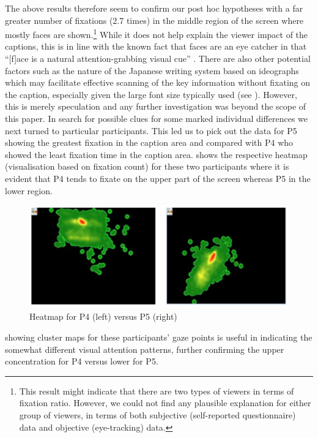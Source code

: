 \documentclass[output=paper]{langsci/langscibook}
\begin{document}
The above results therefore seem to confirm our post hoc hypotheses with a far greater number of fixations (2.7 times) in the middle region of the screen where mostly faces are shown.\footnote{ This result might indicate that there are two types of viewers in terms of fixation ratio. However, we could not find any plausible explanation for either group of viewers, in terms of both subjective (self-reported questionnaire) data and objective (eye-tracking) data.} While it does not help explain the viewer impact of the captions, this is in line with the known fact that faces are an eye catcher in that ``[f]ace is a natural attention-grabbing visual cue'' \citep[264]{perego2010}. There are also other potential factors such as the nature of the Japanese writing system based on ideographs which may facilitate effective scanning of the key information without fixating on the caption, especially given the large font size typically used (see ). However, this is merely speculation and any further investigation was beyond the scope of this paper. In search for possible clues for some marked individual differences we next turned to particular participants.  This led us to pick out the data for P5 showing the greatest fixation in the caption area and compared with P4 who showed the least fixation time in the caption area.   shows the respective heatmap (visualisation based on fixation count) for these two participants where it is evident that P4 tends to fixate on the upper part of the screen whereas P5 in the lower region.

\newpage
\begin{figure}[t]
 \includegraphics[width=\textwidth]{figures/OHagan6.png}
\caption{Heatmap for P4 (left) versus P5 (right)}
\label{ohagan:fig:6}
\end{figure}

 showing cluster maps for these participants' gaze points is useful in indicating the somewhat different visual attention patterns, further confirming the upper concentration for P4 versus lower for P5.
\end{document}
